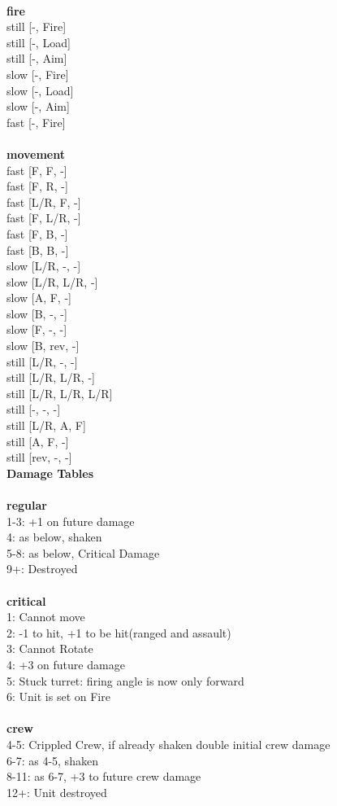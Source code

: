 \ \\ {\bf fire } \\
still [-, Fire] \\
still [-, Load] \\
still [-, Aim] \\
slow [-, Fire] \\
slow [-, Load] \\
slow [-, Aim] \\
fast [-, Fire] \\
\ \\ {\bf movement } \\
fast [F, F, -] \\
fast [F, R, -] \\
fast [L/R, F, -] \\
fast [F, L/R, -] \\
fast [F, B, -] \\
fast [B, B, -] \\
slow [L/R, -, -] \\
slow [L/R, L/R, -] \\
slow [A, F, -] \\
slow [B, -, -] \\
slow [F, -, -] \\
slow [B, rev, -] \\
still [L/R, -, -] \\
still [L/R, L/R, -] \\
still [L/R, L/R, L/R] \\
still [-, -, -] \\
still [L/R, A, F] \\
still [A, F, -] \\
still [rev, -, -] \\


{\bf Damage Tables} \\
\ \\ {\bf regular } \\
1-3: +1 on future damage \\
4: as below, shaken \\
5-8: as below, Critical Damage \\
9+: Destroyed \\
\ \\ {\bf critical } \\
1: Cannot move \\
2: -1 to hit, +1 to be hit(ranged and assault) \\
3: Cannot Rotate \\
4: +3 on future damage \\
5: Stuck turret: firing angle is now only forward \\
6: Unit is set on Fire \\
\ \\ {\bf crew } \\
4-5: Crippled Crew, if already shaken double initial crew damage \\
6-7: as 4-5, shaken \\
8-11: as 6-7, +3 to future crew damage \\
12+: Unit destroyed \\


